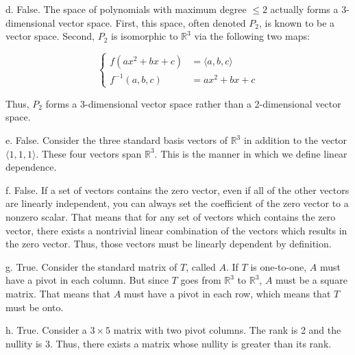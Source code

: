 \documentclass{zupan}
\begin{document}
d. False. The space of polynomials with maximum degree \(\leq 2\) actually
forms a 3-dimensional vector space. First, this space, often denoted \(P_2\),
is known to be a vector space. Second, \(P_2\) is isomorphic to
\(\mathbb{R}^3\) via the following two maps:

\[
  \begin{cases}
    f(ax^2 + bx + c) & = \langle a, b, c \rangle \\
    f^{-1}(a, b, c) & = ax^2 + bx + c
  \end{cases}
\]

Thus, \(P_2\) forms a 3-dimensional vector space rather than a 2-dimensional
vector space.

e. False. Consider the three standard basis vectors of \(\mathbb{R}^3\) in
addition to the vector \(\langle 1, 1, 1 \rangle\). These four vectors span
\(\mathbb{R}^3\). This is the manner in which we define linear dependence.

f. False. If a set of vectors contains the zero vector, even if all of the
other vectors are linearly independent, you can always set the coefficient of
the zero vector to a nonzero scalar. That means that for any set of vectors
which contains the zero vector, there exists a nontrivial linear combination of
the vectors which results in the zero vector. Thus, those vectors must be
linearly dependent by definition.

g. True. Consider the standard matrix of \(T\), called \(A\). If \(T\) is
one-to-one, \(A\) must have a pivot in each column. But since \(T\) goes from
\(\mathbb{R}^3\) to \(\mathbb{R}^3\), \(A\) must be a square matrix. That means
that \(A\) must have a pivot in each row, which means that \(T\) must be onto.

h. True. Consider a \(3 \times 5\) matrix with two pivot columns. The rank is 2
and the nullity is 3. Thus, there exists a matrix whose nullity is greater than
its rank.
\end{document}
